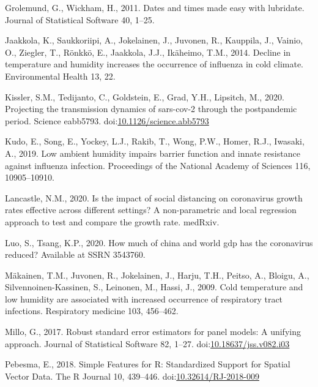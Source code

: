 \documentclass[]{elsarticle} %
\begin{document}
\leavevmode\hypertarget{ref-Grolemund2011dates}{}%
Grolemund, G., Wickham, H., 2011. Dates and times made easy with
lubridate. Journal of Statistical Software 40, 1--25.

\leavevmode\hypertarget{ref-Jaakkola2014decline}{}%
Jaakkola, K., Saukkoriipi, A., Jokelainen, J., Juvonen, R., Kauppila,
J., Vainio, O., Ziegler, T., Rönkkö, E., Jaakkola, J.J., Ikäheimo, T.M.,
2014. Decline in temperature and humidity increases the occurrence of
influenza in cold climate. Environmental Health 13, 22.

\leavevmode\hypertarget{ref-Kissler2020projecting}{}%
Kissler, S.M., Tedijanto, C., Goldstein, E., Grad, Y.H., Lipsitch, M.,
2020. Projecting the transmission dynamics of sars-cov-2 through the
postpandemic period. Science eabb5793.
doi:\href{https://doi.org/10.1126/science.abb5793}{10.1126/science.abb5793}

\leavevmode\hypertarget{ref-Kudo2019low}{}%
Kudo, E., Song, E., Yockey, L.J., Rakib, T., Wong, P.W., Homer, R.J.,
Iwasaki, A., 2019. Low ambient humidity impairs barrier function and
innate resistance against influenza infection. Proceedings of the
National Academy of Sciences 116, 10905--10910.

\leavevmode\hypertarget{ref-Lancastle2020impact}{}%
Lancastle, N.M., 2020. Is the impact of social distancing on coronavirus
growth rates effective across different settings? A non-parametric and
local regression approach to test and compare the growth rate. medRxiv.

\leavevmode\hypertarget{ref-Luo2020how}{}%
Luo, S., Tsang, K.P., 2020. How much of china and world gdp has the
coronavirus reduced? Available at SSRN 3543760.

\leavevmode\hypertarget{ref-Makinen2009cold}{}%
Mäkainen, T.M., Juvonen, R., Jokelainen, J., Harju, T.H., Peitso, A.,
Bloigu, A., Silvennoinen-Kassinen, S., Leinonen, M., Hassi, J., 2009.
Cold temperature and low humidity are associated with increased
occurrence of respiratory tract infections. Respiratory medicine 103,
456--462.

\leavevmode\hypertarget{ref-Millo2017robust}{}%
Millo, G., 2017. Robust standard error estimators for panel models: A
unifying approach. Journal of Statistical Software 82, 1--27.
doi:\href{https://doi.org/10.18637/jss.v082.i03}{10.18637/jss.v082.i03}

\leavevmode\hypertarget{ref-Pebesma2018}{}%
Pebesma, E., 2018. Simple Features for R: Standardized Support for
Spatial Vector Data. The R Journal 10, 439--446.
doi:\href{https://doi.org/10.32614/RJ-2018-009}{10.32614/RJ-2018-009}
\end{document}

